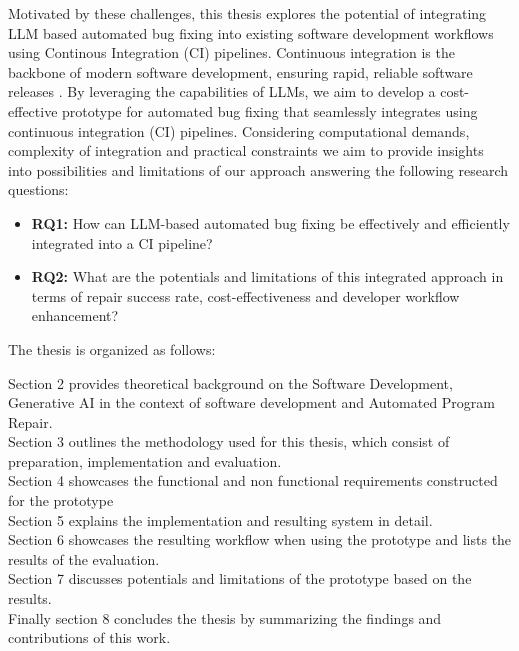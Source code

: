 Motivated by these challenges, this thesis explores the potential of integrating LLM based automated bug fixing into existing software development workflows using Continous Integration (CI) pipelines. Continuous integration is the backbone of modern software development, ensuring rapid, reliable software releases \cite{ugwuezeContinuousIntegrationDeployment2024}. By leveraging the capabilities of LLMs, we aim to develop a cost-effective prototype for automated bug fixing that seamlessly integrates using continuous integration (CI) pipelines. Considering computational demands, complexity of integration and practical constraints we aim to provide insights into possibilities and limitations of our approach answering the following research questions:

\begin{itemize}
    \item \textbf{RQ1:} How can LLM-based automated bug fixing be effectively and efficiently integrated into a CI pipeline?
    \item \textbf{RQ2:} What are the potentials and limitations of this integrated approach in terms of repair success rate, cost-effectiveness and developer workflow enhancement?
\end{itemize}


The thesis is organized as follows:

Section 2 provides theoretical background on the Software Development, Generative AI in the context of software development and Automated Program Repair.\\
Section 3 outlines the methodology used for this thesis, which consist of preparation, implementation and evaluation.\\
Section 4 showcases the functional and non functional requirements constructed for the prototype\\
Section 5 explains the implementation and resulting system in detail.\\
Section 6 showcases the resulting workflow when using the prototype and lists the results of the evaluation.\\
Section 7 discusses potentials and limitations of the prototype based on the results.\\
Finally section 8 concludes the thesis by summarizing the findings and contributions of this work.